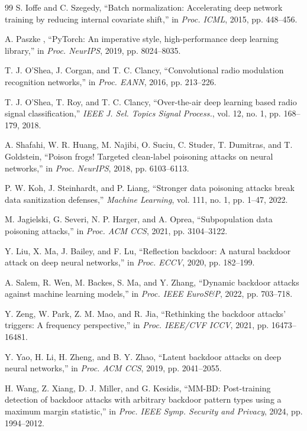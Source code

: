 \begin{thebibliography}{99}
S. Ioffe and C. Szegedy, ``Batch normalization: Accelerating deep network training by reducing internal covariate shift,'' in \emph{Proc. ICML}, 2015, pp. 448--456.

A. Paszke \etal, ``PyTorch: An imperative style, high-performance deep learning library,'' in \emph{Proc. NeurIPS}, 2019, pp. 8024--8035.

T. J. O'Shea, J. Corgan, and T. C. Clancy, ``Convolutional radio modulation recognition networks,'' in \emph{Proc. EANN}, 2016, pp. 213--226.

T. J. O'Shea, T. Roy, and T. C. Clancy, ``Over-the-air deep learning based radio signal classification,'' \emph{IEEE J. Sel. Topics Signal Process.}, vol. 12, no. 1, pp. 168--179, 2018.

A. Shafahi, W. R. Huang, M. Najibi, O. Suciu, C. Studer, T. Dumitras, and T. Goldstein, ``Poison frogs! Targeted clean-label poisoning attacks on neural networks,'' in \emph{Proc. NeurIPS}, 2018, pp. 6103--6113.

P. W. Koh, J. Steinhardt, and P. Liang, ``Stronger data poisoning attacks break data sanitization defenses,'' \emph{Machine Learning}, vol. 111, no. 1, pp. 1--47, 2022.

M. Jagielski, G. Severi, N. P. Harger, and A. Oprea, ``Subpopulation data poisoning attacks,'' in \emph{Proc. ACM CCS}, 2021, pp. 3104--3122.

Y. Liu, X. Ma, J. Bailey, and F. Lu, ``Reflection backdoor: A natural backdoor attack on deep neural networks,'' in \emph{Proc. ECCV}, 2020, pp. 182--199.

A. Salem, R. Wen, M. Backes, S. Ma, and Y. Zhang, ``Dynamic backdoor attacks against machine learning models,'' in \emph{Proc. IEEE EuroS\&P}, 2022, pp. 703--718.

Y. Zeng, W. Park, Z. M. Mao, and R. Jia, ``Rethinking the backdoor attacks' triggers: A frequency perspective,'' in \emph{Proc. IEEE/CVF ICCV}, 2021, pp. 16473--16481.

Y. Yao, H. Li, H. Zheng, and B. Y. Zhao, ``Latent backdoor attacks on deep neural networks,'' in \emph{Proc. ACM CCS}, 2019, pp. 2041--2055.

H. Wang, Z. Xiang, D. J. Miller, and G. Kesidis, ``MM-BD: Post-training detection of backdoor attacks with arbitrary backdoor pattern types using a maximum margin statistic,'' in \emph{Proc. IEEE Symp. Security and Privacy}, 2024, pp. 1994--2012.


\end{thebibliography}
